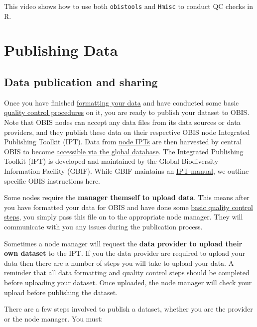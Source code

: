 \documentclass[
  letterpaper,
  DIV=11,
  numbers=noendperiod,
  oneside]{scrreprt}
\begin{document}
This video shows how to use both \texttt{obistools} and \texttt{Hmisc}
to conduct QC checks in R.

\part{Publishing Data}

\hypertarget{data-publication-and-sharing}{%
\chapter{Data publication and
sharing}\label{data-publication-and-sharing}}

Once you have finished \href{formatting.html}{formatting your data} and
have conducted some basic \href{data_qc.html}{quality control
procedures} on it, you are ready to publish your dataset to OBIS. Note
that OBIS nodes can accept any data files from its data sources or data
providers, and they publish these data on their respective OBIS node
Integrated Publishing Toolkit (IPT). Data from
\href{https://ipt.iobis.org/}{node IPTs} are then harvested by central
OBIS to become \protect\hyperlink{full-exports}{accessible via the
global database}. The Integrated Publishing Toolkit (IPT) is developed
and maintained by the Global Biodiversity Information Facility (GBIF).
While GBIF maintains an \href{https://www.gbif.org/ipt}{IPT manual}, we
outline specific OBIS instructions here.

Some nodes require the \textbf{manager themself to upload data}. This
means after you have formatted your data for OBIS and have done some
\href{data_qc.html}{basic quality control steps}, you simply pass this
file on to the appropriate node manager. They will communicate with you
any issues during the publication process.

Sometimes a node manager will request the \textbf{data provider to
upload their own dataset} to the IPT. If you the data provider are
required to upload your data then there are a number of steps you will
take to upload your data. A reminder that all data formatting and
quality control steps should be completed before uploading your dataset.
Once uploaded, the node manager will check your upload before publishing
the dataset.

There are a few steps involved to publish a dataset, whether you are the
provider or the node manager. You must:
\end{document}
